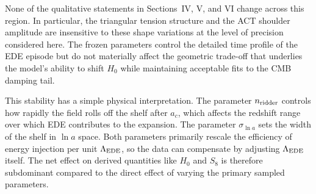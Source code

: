 \documentclass[a4paper,11pt]{article}
\begin{document}
None of the qualitative statements in Sections~IV, V, and VI change across this region. In particular, the triangular tension structure and the ACT shoulder amplitude are insensitive to these shape variations at the level of precision considered here. The frozen parameters control the detailed time profile of the EDE episode but do not materially affect the geometric trade-off that underlies the model's ability to shift $H_0$ while maintaining acceptable fits to the CMB damping tail.

This stability has a simple physical interpretation. The parameter $n_{\rm ridder}$ controls how rapidly the field rolls off the shelf after $a_c$, which affects the redshift range over which EDE contributes to the expansion. The parameter $\sigma_{\ln a}$ sets the width of the shelf in $\ln a$ space. Both parameters primarily rescale the efficiency of energy injection per unit $\Lambda_{\rm EDE}$, so the data can compensate by adjusting $\Lambda_{\rm EDE}$ itself. The net effect on derived quantities like $H_0$ and $S_8$ is therefore subdominant compared to the direct effect of varying the primary sampled parameters.

\end{document}
